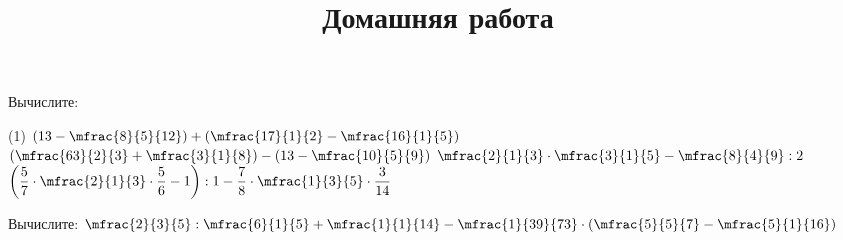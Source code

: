 \begin{consultation}
	\begin{listofex}
		\item Вычислите: 
		\begin{tasks}(1)
			\task \( \left( 13-\mfrac{8}{5}{12} \right)+\left( \mfrac{17}{1}{2}-\mfrac{16}{1}{5} \right) \)
			\task \( \left( \mfrac{63}{2}{3}+\mfrac{3}{1}{8} \right)-\left( 13-\mfrac{10}{5}{9} \right) \)
			\task \( \mfrac{2}{1}{3}\cdot\mfrac{3}{1}{5}-\mfrac{8}{4}{9}:2 \)
			\task \( \left( \dfrac{5}{7}\cdot\mfrac{2}{1}{3}\cdot\dfrac{5}{6}-1 \right):1-\dfrac{7}{8}\cdot\mfrac{1}{3}{5}\cdot\dfrac{3}{14} \)
		\end{tasks}
	\end{listofex}
	\newpage
	\title{Домашняя работа}
	\begin{listofex}
		\item Вычислите: \quad \( \mfrac{2}{3}{5}:\mfrac{6}{1}{5}+\mfrac{1}{1}{14}-\mfrac{1}{39}{73}\cdot\left( \mfrac{5}{5}{7}-\mfrac{5}{1}{16} \right) \)
	\end{listofex}
\end{consultation}
